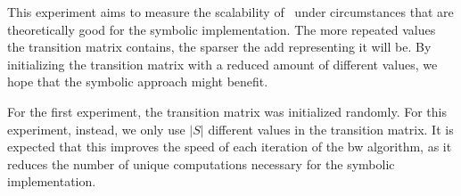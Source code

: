 This experiment aims to measure the scalability of \Cupaal\ under circumstances that are theoretically good for the symbolic implementation.
The more repeated values the transition matrix contains, the sparser the \gls{add} representing it will be.
By initializing the transition matrix with a reduced amount of different values, we hope that the symbolic approach might benefit.

For the first experiment, the transition matrix was initialized randomly.
For this experiment, instead, we only use $|S|$ different values in the transition matrix.
It is expected that this improves the speed of each iteration of the \gls{bw} algorithm, as it reduces the number of unique computations necessary for the symbolic implementation.
